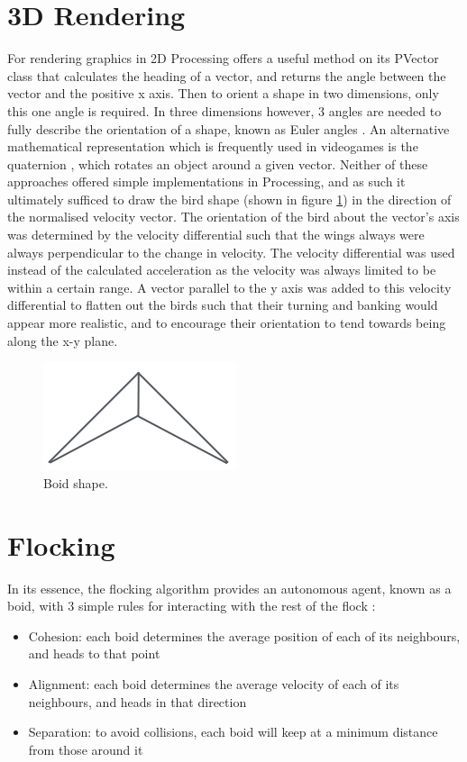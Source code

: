 \documentclass[journal, a4paper]{IEEEtran}
\begin{document}
\section*{3D Rendering}
For rendering graphics in 2D Processing offers a useful method on its PVector class that calculates the heading of a vector, and returns the angle between the vector and the positive x axis. Then to orient a shape in two dimensions, only this one angle is required. In three dimensions however, 3 angles are needed to fully describe the orientation of a shape, known as Euler angles \cite{euler}. An alternative mathematical representation which is frequently used in videogames is the quaternion \cite{quaternion}, which rotates an object around a given vector. Neither of these approaches offered simple implementations in Processing, and as such it ultimately sufficed to draw the bird shape (shown in figure \ref{fig:boid}) in the direction of the normalised velocity vector. The orientation of the bird about the vector's axis was determined by the velocity differential such that the wings always were always perpendicular to the change in velocity. The velocity differential was used instead of the calculated acceleration as the velocity was always limited to be within a certain range. A vector parallel to the y axis was added to this velocity differential to flatten out the birds such that their turning and banking would appear more realistic, and to encourage their orientation to tend towards being along the x-y plane.

\begin{figure}[hbt!]
    \centering
    \includegraphics[width=0.4\columnwidth]{boid.jpeg}
    \caption{Boid shape.}
    \label{fig:boid}
\end{figure}

\section*{Flocking}
In its essence, the flocking algorithm provides an autonomous agent, known as a boid, with 3 simple rules for interacting with the rest of the flock \cite{reynolds}:
\begin{itemize}
  \item Cohesion: each boid determines the average position of each of its neighbours, and heads to that point
  \item Alignment: each boid determines the average velocity of each of its neighbours, and heads in that direction
  \item Separation: to avoid collisions, each boid will keep at a minimum distance from those around it
\end{itemize}
\end{document}
